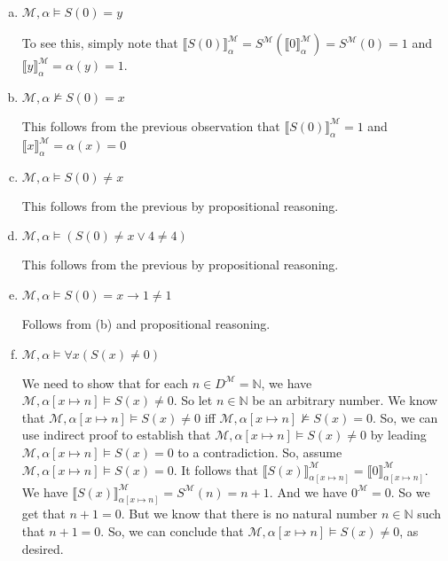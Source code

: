 \begin{enumerate}[\thesection.1]
\begin{enumerate}[(i)]
			\begin{enumerate}[(a)]
			
				\item $\mathcal{M},\alpha\vDash S(0)=y$
				
				To see this, simply note that $\llbracket S(0)\rrbracket^\mathcal{M}_\alpha=S^\mathcal{M}(\llbracket 0\rrbracket^\mathcal{M}_\alpha)=S^\mathcal{M}(0)=1$ and $\llbracket y\rrbracket^\mathcal{M}_\alpha=\alpha(y)=1$.
				
				\item $\mathcal{M},\alpha\nvDash S(0)=x$
				
				This follows from the previous observation that $\llbracket S(0)\rrbracket^\mathcal{M}_\alpha=1$ and $\llbracket x\rrbracket^\mathcal{M}_\alpha=\alpha(x)=0$
				
				\item $\mathcal{M},\alpha\vDash S(0)\neq x$
				
				This follows from the previous by propositional reasoning.
				
				\item $\mathcal{M},\alpha\vDash (S(0)\neq x\lor 4\neq 4)$
				
					This follows from the previous by propositional reasoning.
					
				\item $\mathcal{M},\alpha\vDash S(0)=x\to 1\neq 1$
				
				Follows from (b) and propositional reasoning.
					
				\item $\mathcal{M},\alpha\vDash\forall x(S(x)\neq 0)$

				We need to show that for each  $n\in D^\mathcal{M}=\mathbb{N}$, we have $\mathcal{M},\alpha[x\mapsto n]\vDash S(x)\neq 0$. So let $n\in \mathbb{N}$ be an arbitrary number. We know that  $\mathcal{M},\alpha[x\mapsto n]\vDash S(x)\neq 0$ iff $\mathcal{M},\alpha[x\mapsto n]\nvDash S(x)=0$. So, we can use indirect proof to establish that $\mathcal{M},\alpha[x\mapsto n]\vDash S(x)\neq 0$ by leading $\mathcal{M},\alpha[x\mapsto n]\vDash S(x)=0$ to a contradiction. So, assume $\mathcal{M},\alpha[x\mapsto n]\vDash S(x)=0$. It follows that $\llbracket S(x)\rrbracket^\mathcal{M}_{\alpha[x\mapsto n]}=\llbracket0\rrbracket^\mathcal{M}_{\alpha[x\mapsto n]}$. We have $\llbracket S(x)\rrbracket^\mathcal{M}_{\alpha[x\mapsto n]}=S^\mathcal{M}(n)=n+1$. And we have $0^\mathcal{M}=0$. So we get that $n+1=0$. But we know that there is no natural number $n\in\mathbb{N}$ such that $n+1=0$. So, we can conclude that $\mathcal{M},\alpha[x\mapsto n]\vDash S(x)\neq 0$, as desired.
				

\end{enumerate}
\end{enumerate}
\end{enumerate}
